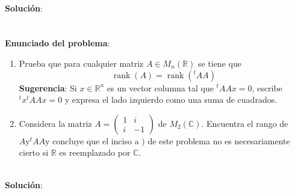 \documentclass{article} %
\begin{document}
\\
\vspace{10 mm}
\textbf{Solución}:


				

\section{}

\textbf{Enunciado del problema}: 

\begin{enumerate}[label=(\alph*)]
\item Prueba que para cualquier matriz $A \in M_{n}(\mathbb{R})$ se tiene que
$$
\operatorname{rank}(A)=\operatorname{rank}\left({ }^{t} A A\right)
$$
\textbf{Sugerencia}: Si $x \in \mathbb{R}^{n}$ es un vector columna tal que ${ }^{t} A A x=0$, escribe ${ }^{t} x{ }^{t} A A x=0$ y expresa el lado izquierdo como una suma de cuadrados.
\item  Considera la matriz $A=\left(\begin{array}{cc}1 & i \\ i & -1\end{array}\right)$ de $M_{2}(\mathbb{C}) .$ Encuentra el rango de $A \mathrm{y}^{t} A A \mathrm{y}$ concluye que el inciso a $)$ de este problema no es necesariamente cierto si $\mathbb{R}$ es reemplazado por $\mathbb{C}$.


\end{enumerate}

\\
\vspace{10 mm}
\textbf{Solución}:


				

\end{document}
